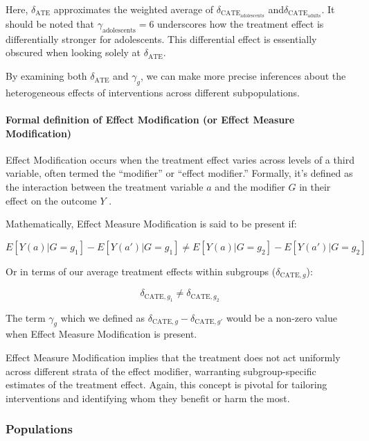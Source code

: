 \documentclass[
  singlecolumn]{article}
\let\oldparagraph\paragraph
\renewcommand{\paragraph}[1]{\oldparagraph{#1}\mbox{}}
\begin{document}
Here, \(\delta_{\text{ATE}}\) approximates the weighted average of
\(\delta_{\text{CATE}_{\text{adolescents}}}\)
and\(\delta_{\text{CATE}_{\text{adults}}}\). It should be noted that
\(\gamma_{\text{adolescents}} = 6\) underscores how the treatment effect
is differentially stronger for adolescents. This differential effect is
essentially obscured when looking solely at \(\delta_{\text{ATE}}\).

By examining both \(\delta_{\text{ATE}}\) and \(\gamma_g\), we can make
more precise inferences about the heterogeneous effects of interventions
across different subpopulations.

\paragraph{Formal definition of Effect Modification (or Effect Measure
Modification)}\label{formal-definition-of-effect-modification-or-effect-measure-modification}

Effect Modification occurs when the treatment effect varies across
levels of a third variable, often termed the ``modifier'' or ``effect
modifier.'' Formally, it's defined as the interaction between the
treatment variable \(a\) and the modifier \(G\) in their effect on the
outcome \(Y\) .

Mathematically, Effect Measure Modification is said to be present if:

\[ 
E[Y(a) | G=g_1] - E[Y(a') | G=g_1] \neq E[Y(a) | G=g_2] - E[Y(a') | G=g_2]
\]

Or in terms of our average treatment effects within subgroups
(\(\delta_{\text{CATE},g}\)):

\[ 
\delta_{\text{CATE},g_1} \neq \delta_{\text{CATE},g_2}
\]

The term \(\gamma_g\) which we defined as
\(\delta_{\text{CATE},g} - \delta_{\text{CATE},g'}\) would be a non-zero
value when Effect Measure Modification is present.

Effect Measure Modification implies that the treatment does not act
uniformly across different strata of the effect modifier, warranting
subgroup-specific estimates of the treatment effect. Again, this concept
is pivotal for tailoring interventions and identifying whom they benefit
or harm the most.

\subsubsection{Populations}\label{populations}
\end{document}

